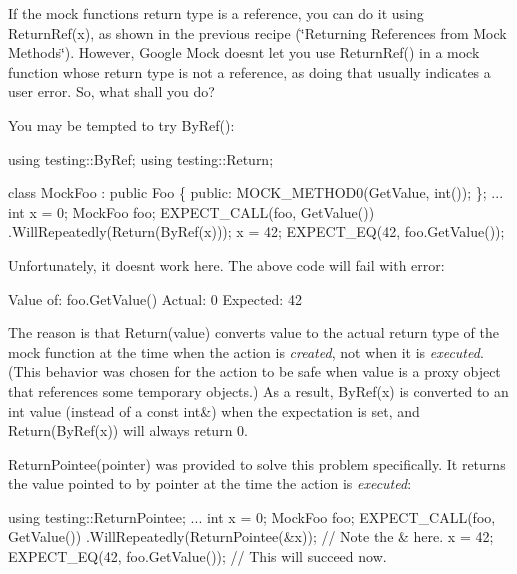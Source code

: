 If the mock function\textquotesingle{}s return type is a reference, you can do it using {\ttfamily Return\+Ref(x)}, as shown in the previous recipe (\char`\"{}\+Returning References
from Mock Methods\char`\"{}). However, Google Mock doesn\textquotesingle{}t let you use {\ttfamily Return\+Ref()} in a mock function whose return type is not a reference, as doing that usually indicates a user error. So, what shall you do?

You may be tempted to try {\ttfamily By\+Ref()}\+:


\begin{DoxyCode}
\textcolor{keyword}{using} testing::ByRef;
\textcolor{keyword}{using} testing::Return;

\textcolor{keyword}{class }MockFoo : \textcolor{keyword}{public} Foo \{
 \textcolor{keyword}{public}:
  MOCK\_METHOD0(GetValue, \textcolor{keywordtype}{int}());
\};
...
  \textcolor{keywordtype}{int} x = 0;
  MockFoo foo;
  EXPECT\_CALL(foo, GetValue())
      .WillRepeatedly(Return(ByRef(x)));
  x = 42;
  EXPECT\_EQ(42, foo.GetValue());
\end{DoxyCode}


Unfortunately, it doesn\textquotesingle{}t work here. The above code will fail with error\+:


\begin{DoxyCode}
Value of: foo.GetValue()
  Actual: 0
Expected: 42
\end{DoxyCode}


The reason is that {\ttfamily Return(value)} converts {\ttfamily value} to the actual return type of the mock function at the time when the action is {\itshape created}, not when it is {\itshape executed}. (This behavior was chosen for the action to be safe when {\ttfamily value} is a proxy object that references some temporary objects.) As a result, {\ttfamily By\+Ref(x)} is converted to an {\ttfamily int} value (instead of a {\ttfamily const int\&}) when the expectation is set, and {\ttfamily Return(\+By\+Ref(x))} will always return 0.

{\ttfamily Return\+Pointee(pointer)} was provided to solve this problem specifically. It returns the value pointed to by {\ttfamily pointer} at the time the action is {\itshape executed}\+:


\begin{DoxyCode}
\textcolor{keyword}{using} testing::ReturnPointee;
...
  \textcolor{keywordtype}{int} x = 0;
  MockFoo foo;
  EXPECT\_CALL(foo, GetValue())
      .WillRepeatedly(ReturnPointee(&x));  \textcolor{comment}{// Note the & here.}
  x = 42;
  EXPECT\_EQ(42, foo.GetValue());  \textcolor{comment}{// This will succeed now.}
\end{DoxyCode}


